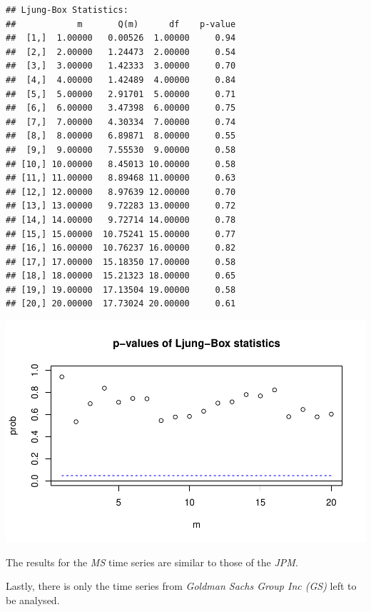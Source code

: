 \documentclass[12pt,a4paper]{article}
\newenvironment{Shaded}{\begin{snugshade}}{\end{snugshade}}
\newcommand{\DataTypeTok}[1]{\textcolor[rgb]{0.13,0.29,0.53}{#1}}
\newcommand{\DecValTok}[1]{\textcolor[rgb]{0.00,0.00,0.81}{#1}}
\newcommand{\KeywordTok}[1]{\textcolor[rgb]{0.13,0.29,0.53}{\textbf{#1}}}
\newcommand{\NormalTok}[1]{#1}
\newcommand{\OperatorTok}[1]{\textcolor[rgb]{0.81,0.36,0.00}{\textbf{#1}}}
\begin{document}
\begin{verbatim}
## Ljung-Box Statistics:  
##            m       Q(m)      df    p-value
##  [1,]  1.00000   0.00526  1.00000     0.94
##  [2,]  2.00000   1.24473  2.00000     0.54
##  [3,]  3.00000   1.42333  3.00000     0.70
##  [4,]  4.00000   1.42489  4.00000     0.84
##  [5,]  5.00000   2.91701  5.00000     0.71
##  [6,]  6.00000   3.47398  6.00000     0.75
##  [7,]  7.00000   4.30334  7.00000     0.74
##  [8,]  8.00000   6.89871  8.00000     0.55
##  [9,]  9.00000   7.55530  9.00000     0.58
## [10,] 10.00000   8.45013 10.00000     0.58
## [11,] 11.00000   8.89468 11.00000     0.63
## [12,] 12.00000   8.97639 12.00000     0.70
## [13,] 13.00000   9.72283 13.00000     0.72
## [14,] 14.00000   9.72714 14.00000     0.78
## [15,] 15.00000  10.75241 15.00000     0.77
## [16,] 16.00000  10.76237 16.00000     0.82
## [17,] 17.00000  15.18350 17.00000     0.58
## [18,] 18.00000  15.21323 18.00000     0.65
## [19,] 19.00000  17.13504 19.00000     0.58
## [20,] 20.00000  17.73024 20.00000     0.61
\end{verbatim}

\includegraphics{exercise_1_files/figure-latex/unnamed-chunk-4-1.pdf}

The results for the \emph{MS} time series are similar to those of the
\emph{JPM}.

Lastly, there is only the time series from \emph{Goldman Sachs Group Inc
(GS)} left to be analysed.

\begin{Shaded}
\end{Shaded}
\end{document}
